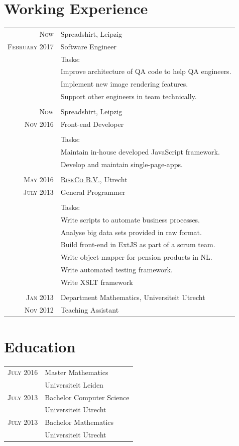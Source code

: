 \documentclass[a4paper,10pt]{article}
\begin{document}
\section{Working Experience}
\begin{tabular}{r|p{11cm}}
\textsc{Now} & Spreadshirt, Leipzig \\
\textsc{February 2017} & Software Engineer\\
& Tasks:\\
& Improve architecture of QA code to help QA engineers.\\
& Implement new image rendering features.\\
& Support other engineers in team technically.\\

 \multicolumn{2}{c}{} \\
\textsc{Now} & Spreadshirt, Leipzig \\
\textsc{Nov 2016} & Front-end Developer\\
\\
& Tasks:\\
& Maintain in-house developed JavaScript framework.\\
& Develop and maintain single-page-apps.\\
 \multicolumn{2}{c}{} \\
 \textsc{May 2016} & \href{http://www.riskco.nl/}{\textsc{RiskCo} B.V.}, Utrecht \\
 \textsc{July 2013}& General Programmer\\
\\
& Tasks:\\
& Write scripts to automate business processes.\\
& Analyse big data sets provided in raw format.\\
& Build front-end in ExtJS as part of a scrum team.\\
& Write object-mapper for pension products in NL.\\
& Write automated testing framework.\\
& Write XSLT framework \\
 \multicolumn{2}{c}{} \\
\textsc{Jan 2013} & Department Mathematics, Universiteit Utrecht \\
\textsc{Nov 2012} & Teaching Assistant\\
\end{tabular}


\section{Education}
\begin{tabular}{rl}	
\textsc{July} 2016 & Master Mathematics\\
& Universiteit Leiden\\
\textsc{July} 2013& Bachelor Computer Science \\
& Universiteit Utrecht \\
\textsc{July} 2013& Bachelor Mathematics \\
& Universiteit Utrecht \\
\end{tabular}
\end{document}
